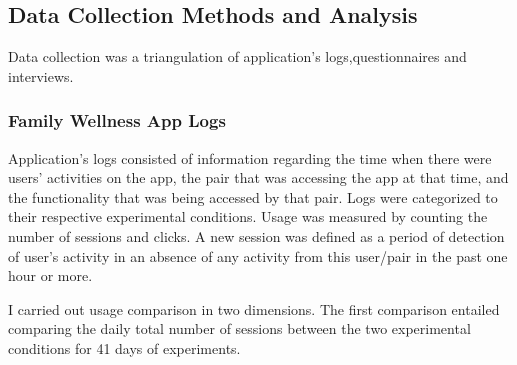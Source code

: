 \subsection{Data Collection Methods and Analysis}
Data collection was a triangulation of application's logs,questionnaires and interviews. 
\subsubsection{Family Wellness App Logs}
Application's logs consisted of information regarding the time when there were users' activities on the app, the pair that was accessing the app at that time, and the functionality that was being accessed by that pair. Logs were categorized to their respective experimental conditions.  
Usage was measured by counting the number of sessions and clicks. A new session was defined as a period of detection of user's activity in an absence of any activity from this user/pair in the past one hour or more.
 
I carried out usage comparison in two dimensions. The first comparison entailed comparing the daily total number of sessions between the two experimental conditions for 41 days of experiments.


